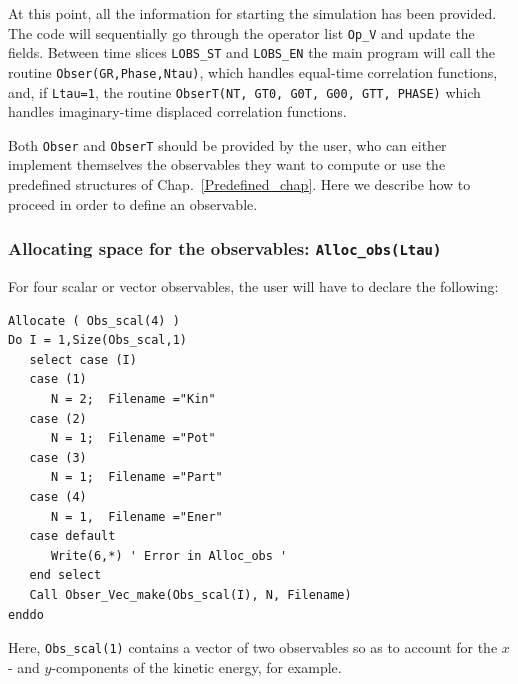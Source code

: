 At this point, all the information for starting the simulation has been provided.  The code will sequentially go through  the operator list  \texttt{Op\_V}  and update the  fields.  Between  time slices  \texttt{LOBS\_ST}  and  \texttt{LOBS\_EN} the main program will call the routine  \texttt{Obser(GR,Phase,Ntau)}, which handles equal-time correlation functions, and, if \texttt{Ltau=1}, the routine \texttt{ObserT(NT,  GT0, G0T, G00, GTT, PHASE)} which handles imaginary-time displaced correlation functions. 

Both \texttt{Obser} and \texttt{ObserT} should be provided by the user, who can either implement themselves the observables they want to compute or use the predefined structures of Chap.~\ref{Predefined_chap}. Here we describe how to proceed in order to define an observable. 

\subsubsection[Allocating space for the observables: \texttt{Alloc\_obs}]{Allocating space for the observables: \texttt{Alloc\_obs(Ltau)}} \label{Alloc_obs_sec}

For  four scalar  or vector observables,  the user will have to  declare the following: 
\begin{lstlisting}[style=fortran]
Allocate ( Obs_scal(4) )
Do I = 1,Size(Obs_scal,1)
   select case (I)
   case (1)
      N = 2;  Filename ="Kin"
   case (2)
      N = 1;  Filename ="Pot"
   case (3)
      N = 1;  Filename ="Part"
   case (4)
      N = 1,  Filename ="Ener"
   case default
      Write(6,*) ' Error in Alloc_obs '  
   end select
   Call Obser_Vec_make(Obs_scal(I), N, Filename)
enddo
\end{lstlisting}
Here,   \texttt{Obs\_scal(1)}   contains a vector  of two observables  so as to account for the $x$- and $y$-components of the kinetic energy, for example.  

